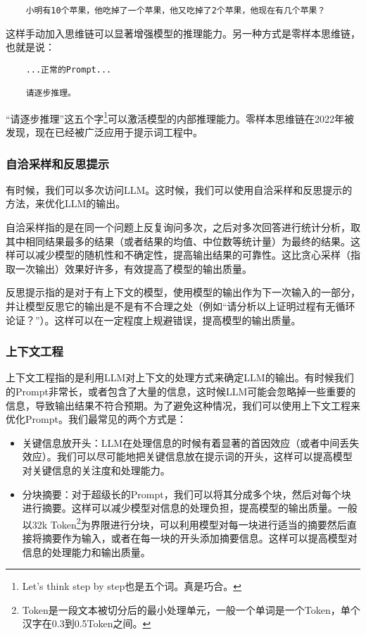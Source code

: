 \documentclass[../main.tex]{subfiles}
\begin{document}
\begin{lstlisting}
    小明有10个苹果，他吃掉了一个苹果，他又吃掉了2个苹果，他现在有几个苹果？
\end{lstlisting}

这样手动加入思维链可以显著增强模型的推理能力。另一种方式是零样本思维链，也就是说：
\begin{lstlisting}
    ...正常的Prompt...

    请逐步推理。
\end{lstlisting}
“请逐步推理”这五个字\footnote{Let's think step by step也是五个词。真是巧合。}可以激活模型的内部推理能力。零样本思维链在2022年被发现，现在已经被广泛应用于提示词工程中。

\subsubsection{自洽采样和反思提示}

有时候，我们可以多次访问LLM。这时候，我们可以使用自洽采样和反思提示的方法，来优化LLM的输出。

自洽采样指的是在同一个问题上反复询问多次，之后对多次回答进行统计分析，取其中相同结果最多的结果（或者结果的均值、中位数等统计量）为最终的结果。这样可以减少模型的随机性和不确定性，提高输出结果的可靠性。这比贪心采样（指取一次输出）效果好许多，有效提高了模型的输出质量。

反思提示指的是对于有上下文的模型，使用模型的输出作为下一次输入的一部分，并让模型反思它的输出是不是有不合理之处（例如“请分析以上证明过程有无循环论证？”）。这样可以在一定程度上规避错误，提高模型的输出质量。

\subsubsection{上下文工程}

上下文工程指的是利用LLM对上下文的处理方式来确定LLM的输出。有时候我们的Prompt非常长，或者包含了大量的信息，这时候LLM可能会忽略掉一些重要的信息，导致输出结果不符合预期。为了避免这种情况，我们可以使用上下文工程来优化Prompt。我们最常见的两个方式是：
\begin{itemize}
  \item 关键信息放开头：LLM在处理信息的时候有着显著的首因效应（或者中间丢失效应）。我们可以尽可能地把关键信息放在提示词的开头，这样可以提高模型对关键信息的关注度和处理能力。
  \item 分块摘要：对于超级长的Prompt，我们可以将其分成多个块，然后对每个块进行摘要。这样可以减少模型对信息的处理负担，提高模型的输出质量。一般以32k Token\footnote{Token是一段文本被切分后的最小处理单元，一般一个单词是一个Token，单个汉字在0.3到0.5Token之间。}为界限进行分块，可以利用模型对每一块进行适当的摘要然后直接将摘要作为输入，或者在每一块的开头添加摘要信息。这样可以提高模型对信息的处理能力和输出质量。
\end{itemize}
\end{document}
